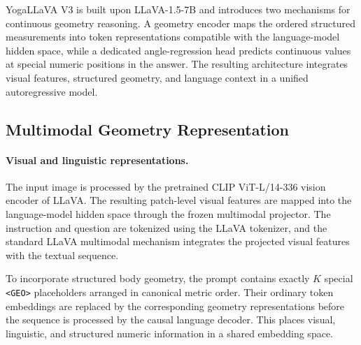 YogaLLaVA V3 is built upon LLaVA-1.5-7B and introduces two mechanisms
for continuous geometry reasoning. A geometry encoder maps the ordered
structured measurements into token representations compatible with the
language-model hidden space, while a dedicated angle-regression head
predicts continuous values at special numeric positions in the answer.
The resulting architecture integrates visual features, structured
geometry, and language context in a unified autoregressive model.

\subsection{Multimodal Geometry Representation}
\label{sec:geometry_representation}

\paragraph{Visual and linguistic representations.}
The input image is processed by the pretrained CLIP ViT-L/14-336 vision
encoder of LLaVA. The resulting patch-level visual features are mapped
into the language-model hidden space through the frozen multimodal
projector. The instruction and question are tokenized using the LLaVA
tokenizer, and the standard LLaVA multimodal mechanism integrates the
projected visual features with the textual sequence.

To incorporate structured body geometry, the prompt contains exactly
$K$ special \texttt{<GEO>} placeholders arranged in canonical metric
order. Their ordinary token embeddings are replaced by the corresponding
geometry representations before the sequence is processed by the causal
language decoder. This places visual, linguistic, and structured numeric
information in a shared embedding space.

